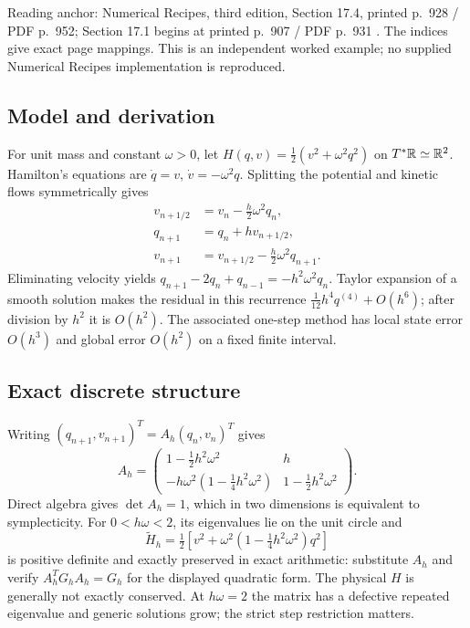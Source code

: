 Reading anchor: Numerical Recipes, third edition, Section 17.4, printed
p.~928 / PDF p.~952; Section 17.1 begins at printed p.~907 / PDF p.~931
\cite{nr}. The indices give exact page mappings. This is an independent
worked example; no supplied Numerical Recipes implementation is reproduced.

\subsection{Model and derivation}
For unit mass and constant $\omega>0$, let
$H(q,v)=\tfrac12(v^2+\omega^2q^2)$ on $T^*\mathbb{R}\simeq\mathbb{R}^2$.
Hamilton's equations are $\dot q=v$, $\dot v=-\omega^2q$.
Splitting the potential and kinetic flows symmetrically gives
\begin{align}
 v_{n+1/2}&=v_n-\tfrac h2\omega^2q_n,\\
 q_{n+1}&=q_n+h v_{n+1/2},\\
 v_{n+1}&=v_{n+1/2}-\tfrac h2\omega^2q_{n+1}.
\end{align}
Eliminating velocity yields
$q_{n+1}-2q_n+q_{n-1}=-h^2\omega^2q_n$.
Taylor expansion of a smooth solution makes the residual in this recurrence
$\tfrac1{12}h^4q^{(4)}+O(h^6)$; after division by $h^2$ it is $O(h^2)$.
The associated one-step method has local state error $O(h^3)$ and global
error $O(h^2)$ on a fixed finite interval.

\subsection{Exact discrete structure}
Writing $(q_{n+1},v_{n+1})^T=A_h(q_n,v_n)^T$ gives
\[
 A_h=\begin{pmatrix}
 1-\tfrac12h^2\omega^2&h\\
 -h\omega^2(1-\tfrac14h^2\omega^2)&1-\tfrac12h^2\omega^2
 \end{pmatrix}.
\]
Direct algebra gives $\det A_h=1$, which in two dimensions is equivalent to
symplecticity. For $0<h\omega<2$, its eigenvalues lie on the unit circle and
\[
 \widetilde H_h=\tfrac12\left[v^2+\omega^2(1-\tfrac14h^2\omega^2)q^2\right]
\]
is positive definite and exactly preserved in exact arithmetic: substitute
$A_h$ and verify $A_h^T G_h A_h=G_h$ for the displayed quadratic form.
The physical $H$ is generally not exactly conserved. At $h\omega=2$ the
matrix has a defective repeated eigenvalue and generic solutions grow;
the strict step restriction matters.

